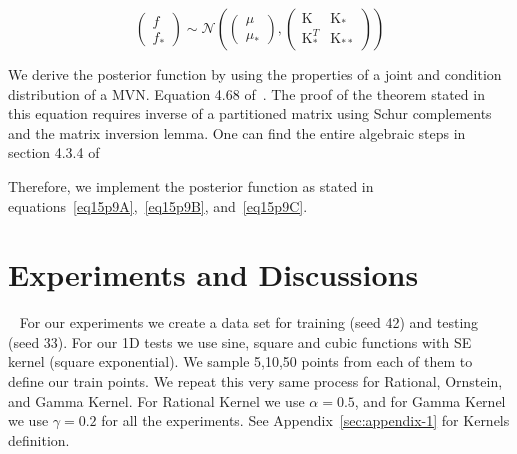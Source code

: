 \documentclass[]{IEEEtran}
\begin{document}
\begin{equation}
\begin{pmatrix} f \\ { f }_{ * } \end{pmatrix}\sim \mathcal{N} \left( \begin{pmatrix} \mu  \\ { \mu  }_{ * } \end{pmatrix},\begin{pmatrix} \mathrm{K}  & { \mathrm{K}  }_{ * } \\ { \mathrm{K}  }_{ * }^{ T } & { \mathrm{K}  }_{ ** } \end{pmatrix} \right) 
\label{eqM15p6_02}
\end{equation}


We derive the posterior function by using the properties of a joint and condition distribution of a MVN. Equation 4.68 of~\cite{Mur2012}. The proof of  the theorem stated in this equation requires inverse of a partitioned matrix using Schur complements and the matrix inversion lemma. One can find the entire algebraic steps in section 4.3.4 of~\cite{Mur2012}  

Therefore, we implement the posterior function as stated in equations~\ref{eq15p9A},~\ref{eq15p9B}, and~\ref{eq15p9C}.

\section{Experiments and Discussions}~\(\)
For our experiments we create a data set for training (seed 42) and testing (seed 33).
For our 1D tests we use sine, square and cubic functions with SE kernel (square exponential). We sample 5,10,50 points from each of them to define our train points. We repeat this very same process for Rational, Ornstein, and Gamma Kernel. For Rational Kernel we use \(\alpha = 0.5\), and for Gamma Kernel we use \(\gamma = 0.2\) for all the experiments. See Appendix~\ref{sec:appendix-1} for Kernels definition.
\end{document}
